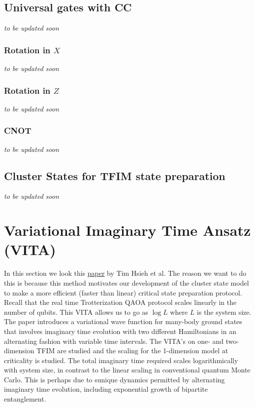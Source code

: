 \documentclass{book}
\theoremstyle{definition}
\begin{document}
\subsection{Universal gates with CC}

\textit{to be updated soon}

\subsubsection{Rotation in $X$}

\textit{to be updated soon}

\subsubsection{Rotation in $Z$}

\textit{to be updated soon}

\subsubsection{CNOT}

\textit{to be updated soon}


\subsection{Cluster States for TFIM state preparation}


\textit{to be updated soon}







\newpage



\section{Variational Imaginary Time Ansatz (VITA)}

In this section we look this \href{https://journals.aps.org/prb/pdf/10.1103/PhysRevB.100.094434}{\underline{paper}} by Tim Hsieh et al. The reason we want to do this is because this method motivates our development of the cluster state model to make a more efficient (faster than linear) critical state preparation protocol. Recall that the real time Trotterization QAOA protocol scales linearly in the number of qubits. This VITA allows us to go as $\log L$ where $L$ is the system size.  \\


The paper introduces a variational wave function for many-body ground states that involves imaginary time evolution with two different Hamiltonians in an alternating fashion with variable time intervals. The VITA's on one- and two-dimension TFIM  are studied and the scaling for the 1-dimension model at criticality is studied. The total imaginary time required scales logarithmically with system size, in contrast to the linear scaling in conventional quantum Monte Carlo. This is perhaps due to sunique dynamics permitted by alternating imaginary time evolution, including exponential growth of bipartite entanglement. 
\end{document}
